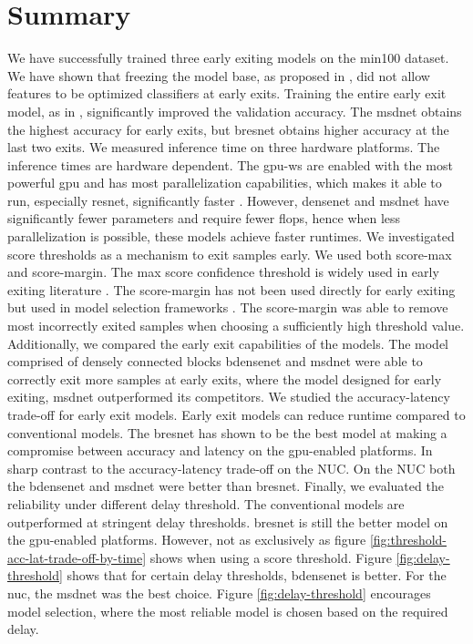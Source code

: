 \section{Summary} \label{sec:ee-summary}
We have successfully trained three early exiting models on the \gls{min100} dataset. We have shown that freezing the model base, as proposed in \cite{leroux_resource-constrained_2015}, did not allow features to be optimized classifiers at early exits. Training the entire early exit model, as in \cite{teerapittayanon_branchynet:_2016}, significantly improved the validation accuracy. The \gls{msdnet} obtains the highest accuracy for early exits, but \gls{bresnet} obtains higher accuracy at the last two exits. 
We measured inference time on three hardware platforms. The inference times are hardware dependent. The \gls{gpu-ws} are enabled with the most powerful \gls{gpu} and has most parallelization capabilities, which makes it able to run, especially \gls{resnet}, significantly faster \cite{lee_energy_2019}. However, \gls{densenet} and \gls{msdnet} have significantly fewer parameters and require fewer \gls{flop}s, hence when less parallelization is possible, these models achieve faster runtimes.
We investigated score thresholds as a mechanism to exit samples early. We used both score-max and score-margin. The max score confidence threshold is widely used in early exiting literature \cite{leroux_resource-constrained_2015, leroux_cascading_2017, kaya_shallow-deep_nodate, berestizshevsky_sacrificing_2019}. The score-margin has not been used directly for early exiting but used in model selection frameworks \cite{park_big/little_2015,tann_flexible_2018}. The score-margin was able to remove most incorrectly exited samples when choosing a sufficiently high threshold value. Additionally, we compared the early exit capabilities of the models. The model comprised of densely connected blocks \gls{bdensenet} and \gls{msdnet} were able to correctly exit more samples at early exits, where the model designed for early exiting, \gls{msdnet} outperformed its competitors. 
We studied the accuracy-latency trade-off for early exit models. Early exit models can reduce runtime compared to conventional models. The \gls{bresnet} has shown to be the best model at making a compromise between accuracy and latency on the \gls{gpu}-enabled platforms. In sharp contrast to the accuracy-latency trade-off on the NUC. On the NUC both the \gls{bdensenet} and \gls{msdnet} were better than \gls{bresnet}.
Finally, we evaluated the reliability under different delay threshold. The conventional models are outperformed at stringent delay thresholds. \gls{bresnet} is still the better model on the \gls{gpu}-enabled platforms. However, not as exclusively as figure \ref{fig:threshold-acc-lat-trade-off-by-time} shows when using a score threshold. Figure \ref{fig:delay-threshold} shows that for certain delay thresholds, \gls{bdensenet} is better. For the \gls{nuc}, the \gls{msdnet} was the best choice.
Figure \ref{fig:delay-threshold} encourages model selection, where the most reliable model is chosen based on the required delay.
